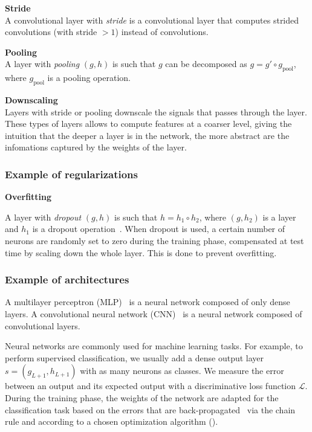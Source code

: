 \begin{definition}\textbf{Stride}\\
A convolutional layer with \emph{stride} is a convolutional layer that computes strided convolutions (with stride $> 1$) instead of convolutions.
\end{definition}

\begin{definition}\textbf{Pooling}\\
A layer with \textit{pooling} $(g,h)$ is such that $g$ can be decomposed as $g = g' \circ g_\text{pool}$, where $g_\text{pool}$ is a pooling operation.
\end{definition}

\begin{remark}\textbf{Downscaling}\\
Layers with stride or pooling downscale the signals that passes through the layer. These types of layers allows to compute features at a coarser level, giving the intuition that the deeper a layer is in the network, the more abstract are the infomations captured by the weights of the layer.
\end{remark}


\subsubsection{Example of regularizations}

\begin{remark}\textbf{Overfitting}
\todo{}
\end{remark}


A layer with \textit{dropout} $(g,h)$ is such that $h = h_1 \circ h_2$, where $(g,h_2)$ is a layer and $h_1$ is a dropout operation~\citep{srivastava2014dropout}. When dropout is used, a certain number of neurons are randomly set to zero during the training phase, compensated at test time by scaling down the whole layer. This is done to prevent overfitting.

\subsubsection{Example of architectures}
\label{sec:nn_arch}


A multilayer perceptron (MLP)~\citep{hornik1989multilayer} is a neural network composed of only dense layers.
A convolutional neural network (CNN)~\citep{lecun1998gradient} is a neural network composed of convolutional layers.

Neural networks are commonly used for machine learning tasks. For example, to perform supervised classification, we usually add a dense output layer $s=(g_{L+1},h_{L+1})$ with as many neurons as classes. We measure the error between an output and its expected output with a discriminative loss function $\mathcal{L}$. During the training phase, the weights of the network are adapted for the classification task based on the errors that are back-propagated~\citep{hornik1989multilayer} via the chain rule and according to a chosen optimization algorithm (\eg \cite{bottou2010large}).
